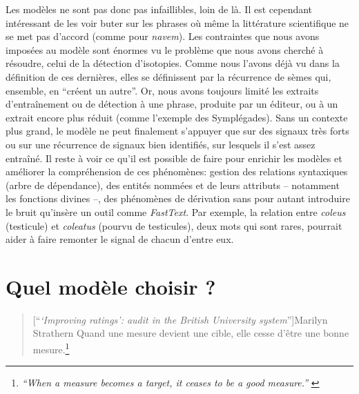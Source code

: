Les modèles ne sont pas donc pas infaillibles, loin de là. Il est cependant intéressant de les voir buter sur les phrases où même la littérature scientifique ne se met pas d'accord (comme pour \textit{navem}). Les contraintes que nous avons imposées au modèle sont énormes vu le problème que nous avons cherché à résoudre, celui de la détection d'isotopies. Comme nous l'avons déjà vu dans la définition de ces dernières, elles se définissent par la récurrence de sèmes qui, ensemble, en ``créent un autre''. Or, nous avons toujours limité les extraits d'entraînement ou de détection à une phrase, produite par un éditeur, ou à un extrait encore plus réduit (comme l'exemple des Symplégades). Sans un contexte plus grand, le modèle ne peut finalement s'appuyer que sur des signaux très forts ou sur une récurrence de signaux bien identifiés, sur lesquels il s'est assez entraîné. Il reste à voir ce qu'il est possible de faire pour enrichir les modèles et améliorer la compréhension de ces phénomènes: gestion des relations syntaxiques (arbre de dépendance), des entités nommées et de leurs attributs -- notamment les fonctions divines --, des phénomènes de dérivation sans pour autant introduire le bruit qu'insère un outil comme \textit{FastText}. Par exemple, la relation entre \textit{coleus} (testicule) et \textit{coleatus} (pourvu de testicules), deux mots qui sont rares, pourrait aider à faire remonter le signal de chacun d'entre eux. %





\section{Quel modèle choisir ?}

\begin{quote}[\enquote{\textit{‘Improving ratings’: audit in the British University system}}]{Marilyn Strathern}
    Quand une mesure devient une cible, elle cesse d'être une bonne mesure.\footnote{\textit{\enquote{When a measure becomes a target, it ceases to be a good measure.}} \textcite{strathern_improving_1997}}
\end{quote}

